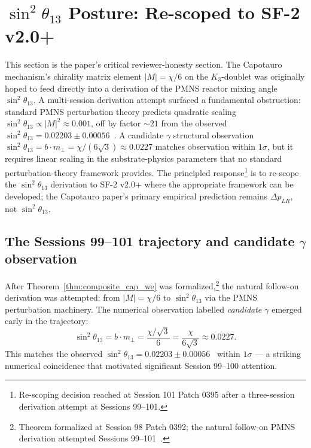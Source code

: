 \documentclass[11pt,letterpaper]{article}
\newcommand{\Kthree}{\ensuremath{K_3}}
\newcommand{\DeltapLR}{\Delta p_{LR}}
\begin{document}
\section{$\sin^2\theta_{13}$ Posture: Re-scoped to SF-2 v2.0+}\label{sec:sin2theta13}

This section is the paper's critical reviewer-honesty section. The Capotauro mechanism's chirality matrix element $|M| = \chi/6$ on the $\Kthree$-doublet was originally hoped to feed directly into a derivation of the PMNS reactor mixing angle $\sin^2\theta_{13}$. A multi-session derivation attempt surfaced a fundamental obstruction: standard PMNS perturbation theory predicts quadratic scaling $\sin^2\theta_{13} \propto |M|^2 \approx 0.001$, off by factor $\sim 21$ from the observed $\sin^2\theta_{13} = 0.02203 \pm 0.00056$~\cite{nufit_60}. A candidate $\gamma$ structural observation $\sin^2\theta_{13} = b \cdot m_\perp = \chi/(6\sqrt{3}) \approx 0.0227$ matches observation within $1\sigma$, but it requires linear scaling in the substrate-physics parameters that no standard perturbation-theory framework provides. The principled response\footnote{Re-scoping decision reached at Session 101 Patch 0395 after a three-session derivation attempt at Sessions 99--101.} is to re-scope the $\sin^2\theta_{13}$ derivation to SF-2 v2.0+ where the appropriate framework can be developed; the Capotauro paper's primary empirical prediction remains $\DeltapLR$, not $\sin^2\theta_{13}$.

\subsection{The Sessions 99--101 trajectory and candidate $\gamma$ observation}\label{sec:gamma_observation}

After Theorem~\ref{thm:composite_cap_we} was formalized,\footnote{Theorem formalized at Session 98 Patch 0392; the natural follow-on PMNS derivation attempted Sessions 99--101~\cite{abshier_capotauro_subclaim_c_sketch}.} the natural follow-on derivation was attempted: from $|M| = \chi/6$ to $\sin^2\theta_{13}$ via the PMNS perturbation machinery. The numerical observation labelled \emph{candidate $\gamma$} emerged early in the trajectory:
\begin{equation}\label{eq:candidate_gamma}
\sin^2\theta_{13} = b \cdot m_\perp = \frac{\chi/\sqrt{3}}{6} = \frac{\chi}{6\sqrt{3}} \approx 0.0227.
\end{equation}
This matches the observed $\sin^2\theta_{13} = 0.02203 \pm 0.00056$~\cite{nufit_60} within $1\sigma$ --- a striking numerical coincidence that motivated significant Session 99--100 attention.
\end{document}
